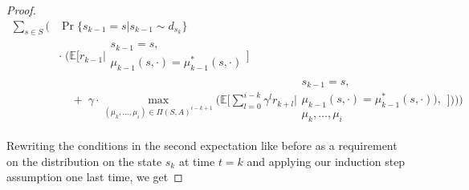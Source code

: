 \documentclass[11pt]{article} %
\begin{document}
\begin{proof}
\begin{equation}
	\begin{array}{rll}
		\sum\limits_{s \in S} \Big(	& \Pr\{ s_{k-1} = s | s_{k-1} \sim d_{s_k}\} \\
									& \cdot \; \Big( \mathbb{E} \Big[ r_{k-1} \Big| \begin{array}{c}
																						s_{k-1} = s, \\
																						\mu_{k-1}(s,\cdot) = \mu_{k-1}^*(s,\cdot)
																					\end{array} \Big] \\
									& \; \; \; \; + \; \gamma \cdot \max\limits_{(\mu_k,\dots,\mu_i) \in \Pi(S,A)^{i-k+1}} \Big( \mathbb{E}\Big[ \sum\limits_{l=0}^{i-k} \gamma^l r_{k+l} \Big| \begin{array}{c}
																																																s_{k-1} = s, \\
																																																\mu_{k-1}(s,\cdot) = \mu_{k-1}^*(s,\cdot)), \\
																																																\mu_k,\dots,\mu_i
																																															\end{array} \Big] \Big) \Big) \Big)
	\end{array}
\end{equation}

Rewriting the conditions in the second expectation like before as a requirement on the distribution on the state $s_k$ at time $t = k$ and applying our induction step assumption one last time, we get


\end{proof}
\end{document}
